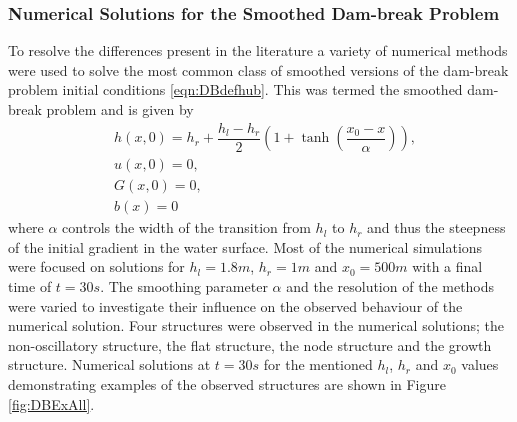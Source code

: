 \subsubsection{Numerical Solutions for the Smoothed Dam-break Problem}
To resolve the differences present in the literature a variety of numerical methods were used to solve the most common class of smoothed versions of the dam-break problem initial conditions \eqref{eqn:DBdefhub}. This was termed the smoothed dam-break problem and is given by
\begin{subequations}
	\begin{align}
	&h(x,0) = h_r + \dfrac{h_l - h_r}{2} \left(1 +  \tanh\left(\dfrac{x_0 - x}{\alpha}\right) \right), \\
	&u(x,0) = 0 , \\
	&G(x,0) = 0 , \\
	&b(x) = 0
	\end{align}
	\label{eqn:SmoothDB}
\end{subequations}
where $\alpha$ controls the width of the transition from $h_l$ to $h_r$ and thus the steepness of the initial gradient in the water surface. Most of the numerical simulations were focused on solutions for $h_l = 1.8m$, $h_r = 1m$ and $x_0 = 500m$ with a final time of $t=30s$. The smoothing parameter $\alpha$ and the resolution of the methods were varied to investigate their influence on the observed behaviour of the numerical solution. Four structures were observed in the numerical solutions; the non-oscillatory structure, the flat structure, the node structure and the growth structure. Numerical solutions at $t=30s$ for the mentioned $h_l$, $h_r$ and $x_0$ values demonstrating examples of the observed structures are shown in Figure \ref{fig:DBExAll}. 
